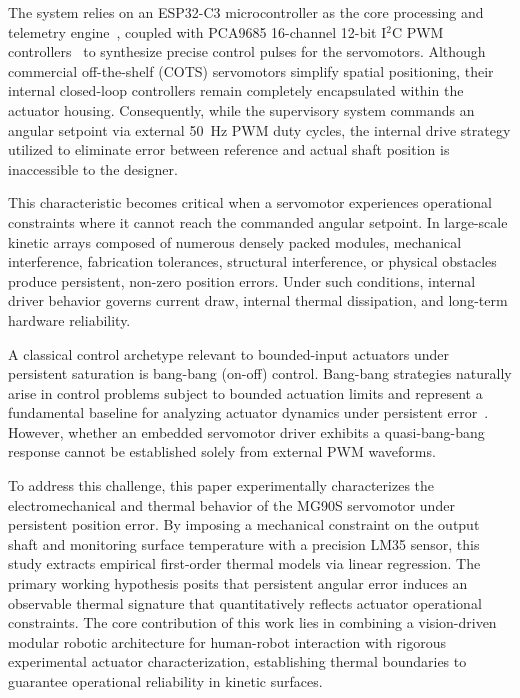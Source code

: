 \documentclass[lettersize,journal]{IEEEtran}
\begin{document}
The system relies on an ESP32-C3 microcontroller as the core processing and telemetry engine~\cite{espressif2024esp32c3}, coupled with PCA9685 16-channel 12-bit I$^2$C PWM controllers~\cite{nxp2024pca9685} to synthesize precise control pulses for the servomotors. Although commercial off-the-shelf (COTS) servomotors simplify spatial positioning, their internal closed-loop controllers remain completely encapsulated within the actuator housing. Consequently, while the supervisory system commands an angular setpoint via external 50~Hz PWM duty cycles, the internal drive strategy utilized to eliminate error between reference and actual shaft position is inaccessible to the designer.

This characteristic becomes critical when a servomotor experiences operational constraints where it cannot reach the commanded angular setpoint. In large-scale kinetic arrays composed of numerous densely packed modules, mechanical interference, fabrication tolerances, structural interference, or physical obstacles produce persistent, non-zero position errors. Under such conditions, internal driver behavior governs current draw, internal thermal dissipation, and long-term hardware reliability.

A classical control archetype relevant to bounded-input actuators under persistent saturation is bang-bang (on-off) control. Bang-bang strategies naturally arise in control problems subject to bounded actuation limits and represent a fundamental baseline for analyzing actuator dynamics under persistent error~\cite{boyd1991linear}. However, whether an embedded servomotor driver exhibits a quasi-bang-bang response cannot be established solely from external PWM waveforms.

To address this challenge, this paper experimentally characterizes the electromechanical and thermal behavior of the MG90S servomotor under persistent position error. By imposing a mechanical constraint on the output shaft and monitoring surface temperature with a precision LM35 sensor, this study extracts empirical first-order thermal models via linear regression. The primary working hypothesis posits that persistent angular error induces an observable thermal signature that quantitatively reflects actuator operational constraints. The core contribution of this work lies in combining a vision-driven modular robotic architecture for human-robot interaction with rigorous experimental actuator characterization, establishing thermal boundaries to guarantee operational reliability in kinetic surfaces.
\end{document}
